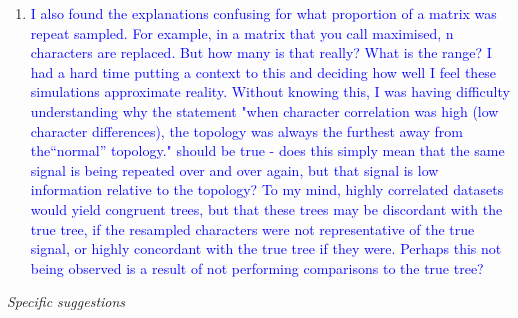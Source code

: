 \documentclass[12pt,letterpaper]{article}
\renewcommand{\subsection}[1]{%
\bigskip
\begin{center}
\begin{large}
\normalfont\itshape #1
\end{large}
\end{center}}
\begin{document}
\begin{enumerate}
\item{\textcolor{blue}{I also found the explanations confusing for what proportion of a matrix was repeat sampled. For example, in a matrix that you call maximised, n characters are replaced. But how many is that really? What is the range? I had a hard time putting a context to this and deciding how well I feel these simulations approximate reality.  Without knowing this, I was having difficulty understanding why the statement "when character correlation was high (low character differences), the topology was always the furthest away from the``normal'' topology." 
should be true - does this simply mean that the same signal is being repeated over and over again, but that signal is low information relative to the topology? To my mind, highly correlated datasets would yield congruent trees, but that these trees may be discordant with the true tree, if the resampled characters were not representative of the true signal, or highly concordant with the true tree if they were. Perhaps this not being observed is a result of not performing comparisons to the true tree?}}


\end{enumerate}

\subsection{Specific suggestions}
\end{document}
